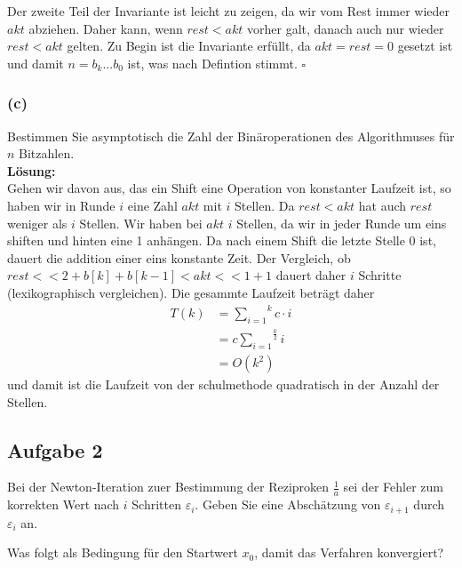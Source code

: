 \documentclass[11pt,a4paper,ngerman]{article}
\begin{document}
Der zweite Teil der Invariante ist leicht zu zeigen, da wir vom Rest immer wieder $akt$ abziehen. Daher kann, wenn $rest < akt$ vorher galt,
danach auch nur wieder $rest<akt$ gelten. Zu Begin ist die Invariante erfüllt, da $akt = rest = 0$ gesetzt ist und damit
$n = b_k ... b_0$ ist, was nach Defintion stimmt.
\mbox{} \hfill $\square$
\subsubsection*{(c)}

Bestimmen Sie asymptotisch die Zahl der Binäroperationen des Algorithmuses für $n$ Bitzahlen.\\

\textbf{Lösung:}\\

Gehen wir davon aus, das ein Shift eine Operation von konstanter Laufzeit ist, so
haben wir in Runde $i$ eine Zahl $akt$ mit $i$ Stellen. Da $rest < akt$ hat auch $rest$ weniger als $i$ Stellen.
Wir haben bei $akt$ $i$ Stellen, da wir in jeder Runde um eins shiften und hinten eine 1 anhängen. Da nach einem Shift
die letzte Stelle 0 ist, dauert die addition einer eins konstante Zeit.
Der Vergleich, ob $rest<<2 +b[k] + b[k-1] <  akt << 1 + 1$ dauert daher $i$ Schritte (lexikographisch vergleichen).
Die gesammte Laufzeit beträgt daher
\begin{equation}\begin{split}
    T(k) &= \overset{k}{\underset{i=1}{\sum}} c \cdot i\\
        &= c \overset{\frac{k}{2}}{\underset{i=1}{\sum}} i\\
        &= O (k^2)
\end{split}\end{equation}
und damit ist die Laufzeit von der schulmethode quadratisch in der Anzahl der Stellen.
\subsection*{Aufgabe 2}

Bei der Newton-Iteration zuer Bestimmung der Reziproken $\frac{1}{a}$ sei der Fehler zum korrekten Wert nach $i$ Schritten $\varepsilon_i$. Geben Sie eine Abschätzung von $\varepsilon_{i+1}$ durch $\varepsilon_i$ an.

Was folgt als Bedingung für den Startwert $x_0$, damit das Verfahren konvergiert?\\
\end{document}
